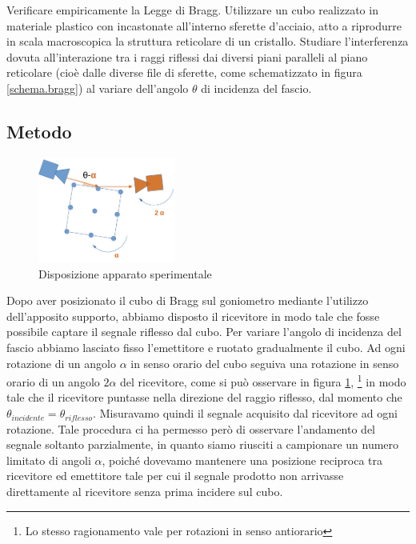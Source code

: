 \documentclass[a4paper]{article}
\begin{document}
Verificare empiricamente la Legge di Bragg. Utilizzare un cubo realizzato in materiale plastico con incastonate all'interno sferette d'acciaio, atto a  riprodurre in scala macroscopica la struttura reticolare di un cristallo. Studiare l'interferenza dovuta all'interazione tra i raggi riflessi dai diversi piani paralleli al piano reticolare (cioè dalle diverse file di sferette, come schematizzato in figura \ref{schema.bragg}) al variare dell'angolo $\theta$ di incidenza del fascio.

\subsection{Metodo}
\begin{figure}[htbp]
	\centering
	\includegraphics[width=0.4\textwidth]{grafici/disposizione.bragg.png}
	\caption{Disposizione apparato sperimentale}
	\label{disposizione.bragg}
\end{figure}

Dopo aver posizionato il cubo di Bragg sul goniometro mediante l'utilizzo dell'apposito supporto, abbiamo disposto il ricevitore in modo tale che fosse possibile captare il segnale riflesso dal cubo. Per variare l'angolo di incidenza del fascio abbiamo lasciato fisso l'emettitore e ruotato gradualmente il cubo. Ad ogni rotazione di un angolo $\alpha$ in senso orario del cubo seguiva una rotazione in senso orario di un angolo $2\alpha$ del ricevitore, come si può osservare in figura \ref{disposizione.bragg}, \footnote{Lo stesso ragionamento vale per rotazioni in senso antiorario} in modo tale che il ricevitore puntasse nella direzione del raggio riflesso, dal momento che $\theta_{incidente} = \theta_{riflesso}$. Misuravamo quindi il segnale acquisito dal ricevitore ad ogni rotazione. Tale procedura ci ha permesso però di osservare l'andamento del segnale soltanto parzialmente, in quanto siamo riusciti a campionare un numero limitato di angoli $\alpha$, poiché dovevamo mantenere una posizione reciproca tra ricevitore ed emettitore tale per cui il segnale prodotto non arrivasse direttamente al ricevitore senza prima incidere sul cubo.
\end{document}
